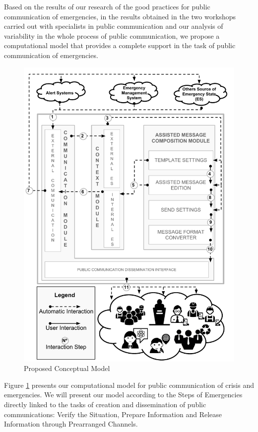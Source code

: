 Based on the results of our research of the good practices for public communication of emergencies, in the results obtained in the two workshops carried out with specialists in public communication and our analysis of variability in the whole process of public communication, we propose a computational model that provides a complete support in the task of public communication of emergencies.   

\begin{figure}[ht!]
\begin{center}
  \includegraphics[width=\linewidth, keepaspectratio]{images/ConceptualModel.pdf}
\caption{Proposed Conceptual Model}
\label{fig:ConceptualModel}
\end{center}
\end{figure}

Figure \ref{fig:ConceptualModel} presents our computational model for public communication of crisis and emergencies. We will present our model according to the Steps of Emergencies directly linked to the tasks of creation and dissemination of public communications: Verify the Situation, Prepare Information and Release Information through Prearranged Channels.

